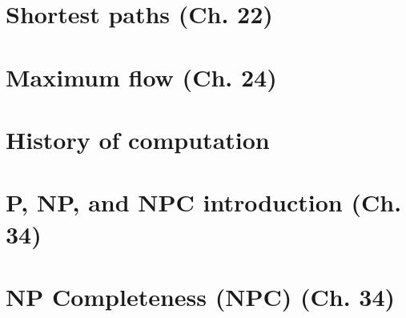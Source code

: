 \documentclass{article}
\begin{document}

\section{Shortest paths (Ch. 22)}

\newpage


\section{Maximum flow (Ch. 24)}

\newpage


\section{History of computation}

\newpage


\section{P, NP, and NPC introduction (Ch. 34)}

\newpage

\section{NP Completeness (NPC) (Ch. 34)} 


\end{document}
